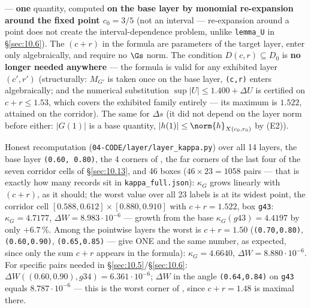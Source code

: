 --- \textbf{one} quantity, computed \textbf{on the base layer by monomial re-expansion around the fixed point $c_{0} = 3/5$}
(not an interval --- re-expansion around a point does not create the interval-dependence problem,
unlike \texttt{lemma\_U} in \S\ref{sec:10.6}). The $(c+r)$ in the formula are parameters of the target layer, enter only
algebraically, and require no $\Gs$ norm. The condition $D(c,r) \subseteq D_{0}$ is \textbf{no longer needed anywhere} ---
the formula is valid for any exhibited layer $(c',r')$ (structurally: $M_{G'}$ is taken once on the base layer,
\texttt{(c,r)} enters algebraically; and the numerical substitution $\sup|U| \le 1.400 + \Delta U$ is certified on
$c+r \le 1.53$, which covers the exhibited family entirely --- its maximum is $1.522$, attained on the corridor).
The same for $\Delta s$
(it did not depend on the layer norm before either: $|G(1)|$ is a base quantity,
$|h(1)| \le \norm{h}_{X(c_{0},r_{0})}$ by (E2)).

Honest recomputation (\texttt{04-\allowbreak CODE/\allowbreak layer/\allowbreak layer\_\allowbreak kappa.py}) over all 14 layers, the base
layer \texttt{(0.60, 0.80)}, the 4 corners of \Qcell, the far corners of the last four of the
seven corridor cells of \S\ref{sec:10.13}, and 46 boxes
($46 \times 23 = 1058$ pairs --- that is exactly how many records sit in \texttt{kappa\_\allowbreak full.json}):
$\kappa_G$ grows linearly with $(c+r)$, as it should; the worst value over all 23 labels is at
its widest point, the corridor cell $[0.588,0.612]\times[0.880,0.910]$ with $c+r = 1.522$, box \texttt{g43}:
$\kappa_G = 4.7177$, $\Delta W = 8.983\cdot 10^{-6}$ --- growth from the base $\kappa_G(g43) = 4.4197$ by only
$+6.7\,\%$. Among the pointwise layers the worst is $c+r=1.50$ (\texttt{(0.70,0.80)}, \texttt{(0.60,0.90)},
\texttt{(0.65,0.85)} --- give ONE and the same number, as expected, since only the sum $c+r$ appears in
the formula): $\kappa_G = 4.6640$, $\Delta W = 8.880\cdot 10^{-6}$. For specific pairs needed in
\S\ref{sec:10.5}/\S\ref{sec:10.6}:
$\Delta W((0.60,0.90), g34) = 6.361\cdot 10^{-6}$; $\Delta W$ in the angle \Qcell{} \texttt{(0.64,0.84)} on \texttt{g43}
equals $8.787\cdot 10^{-6}$ --- this is the worst corner of \Qcell, since $c+r = 1.48$ is maximal there.

